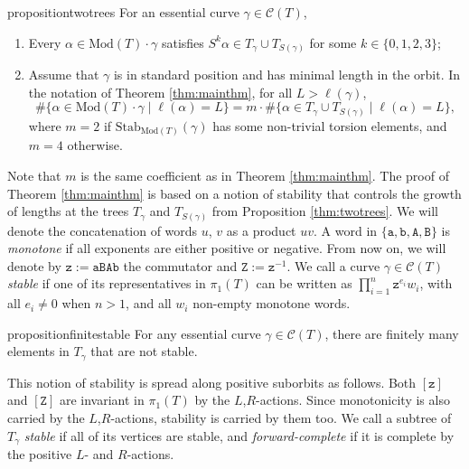 \documentclass{article}
\begin{document}
    
	
	\begin{restatable}{proposition}{twotrees}\label{thm:twotrees} For an essential curve $\gamma\in \mathcal{C}(T)$, 
		\begin{enumerate}
			\item Every $\alpha\in \mathrm{Mod}(T)\cdot \gamma$ satisfies $S^k\alpha\in T_\gamma\cup T_{S(\gamma)}$ for some $k\in\{0,1,2,3\}$;
			\item Assume that $\gamma$ is in standard position and has minimal length in the orbit. In the notation of Theorem \ref{thm:mainthm}, for all $L > \ell(\gamma)$,
			\[
			\#\{\alpha\in\mathrm{Mod}(T)\cdot \gamma\mid \ell(\alpha)=L\}=m\cdot \# \{ \alpha \in T_\gamma\cup T_{S(\gamma)} \mid \ell(\alpha) = L \},
			\]
			where 
			$m=2$ if $\mathrm{Stab}_{\mathrm{Mod}(T)}(\gamma)$ has some non-trivial torsion elements, and $m=4$ otherwise. 
		\end{enumerate}
		
	\end{restatable}
	
	Note that $m$ is the same coefficient as in Theorem \ref{thm:mainthm}. The proof of Theorem \ref{thm:mainthm} is based on a notion of stability that controls the growth of lengths at the trees $T_\gamma$ and $T_{S(\gamma)}$ from Proposition \ref{thm:twotrees}. We will denote the concatenation of words $u$, $v$ as a product $uv$. A word in $\{\mathtt{a,b,A,B}\}$ is \emph{monotone} if all exponents are either positive or negative. From now on, we will denote by $\mathtt{z}:=\mathtt{aBAb}$ the commutator and $\mathtt{Z}:=\mathtt{z}^{-1}$. We call a curve $\gamma\in\mathcal{C}(T)$ \emph{stable} if one of its representatives in $\pi_1(T)$ can be written as $\prod_{i=1}^n \mathtt{z}^{e_i}w_i$, with all $e_i\neq0$ when $n>1$, and all $w_i$ non-empty monotone words. 
	
	\begin{restatable}{proposition}{finitestable}\label{prop:nonstable}
		For any essential curve $\gamma\in\mathcal{C}(T)$, there are finitely many elements in $T_\gamma$ that are not stable.
	\end{restatable}
	
	This notion of stability is spread along positive suborbits as follows. Both $[\mathtt{z}]$ and $[\mathtt{Z}]$ are invariant in $\pi_1(T)$ by the $L$,$R$-actions. Since monotonicity is also carried by the $L$,$R$-actions, stability is carried by them too. We call a subtree of $T_\gamma$ \emph{stable} if all of its vertices are stable, and \emph{forward-complete} if it is complete by the positive $L$- and $R$-actions.
	
\end{document}
